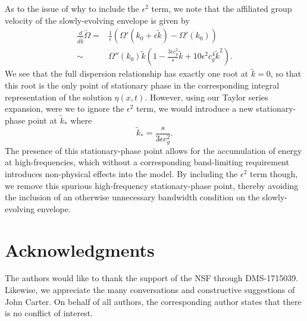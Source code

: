 \documentclass[a4paper,11pt]{article}
\begin{document}
As to the issue of why to include the $\epsilon^{2}$ term, we note that the affiliated group velocity of the slowly-evolving envelope is given by 
\begin{align*}
\frac{d}{d\tilde{k}}\tilde{\Omega} = & \frac{1}{\epsilon}\left(\Omega'(k_{0}+\epsilon \tilde{k}) - \Omega'(k_{0})\right)\\
\sim & \Omega''(k_{0})\tilde{k}\left(1 - \frac{3\epsilon c_{g}^{2}}{s}\tilde{k} + 10 \epsilon^{2}c_{g}^{4}\tilde{k}^{2}\right).
\end{align*}
We see that the full dispersion relationship has exactly one root at $\tilde{k}=0$, so that this root is the only point of stationary phase in the corresponding integral representation of the solution $\eta(x,t)$.  However, using our Taylor series expansion, were we to ignore the $\epsilon^{2}$ term, we would introduce a new stationary-phase point at $\tilde{k}_{\ast}$ where
\[
\tilde{k}_{\ast} = \frac{s}{3\epsilon c_{g}^{2}}.
\]
The presence of this stationary-phase point allows for the accumulation of energy at high-frequencies, which without a corresponding band-limiting requirement introduces non-physical effects into the model.  By including the $\epsilon^{2}$ term though, we remove this spurious high-frequency stationary-phase point, thereby avoiding the inclusion of an otherwise unnecessary bandwidth condition on the slowly-evolving envelope.

\section*{Acknowledgments}
The authors would like to thank the support of the NSF through DMS-1715039.  Likewise, we appreciate the many conversations and constructive suggestions of John Carter.  On behalf of all authors, the corresponding author states that there is no conflict of interest.

\pagebreak


\end{document}
